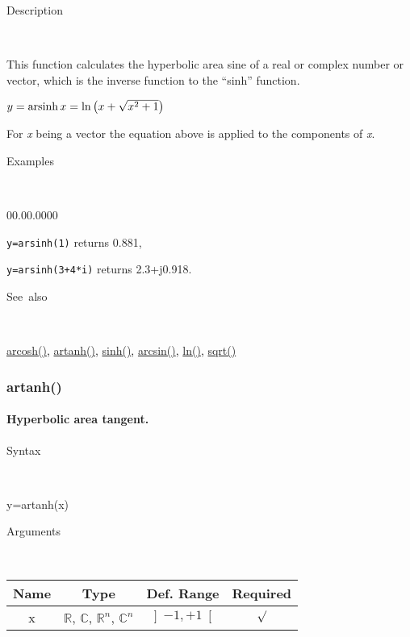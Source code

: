 \begin{description}
\item [Description]~
\end{description}
This function calculates the hyperbolic area sine of a real or complex
number or vector, which is the inverse function to the {}``sinh''
function.

\medskip{}
$y=\textrm{arsinh\,}x=\ln\left(x+\sqrt{x^{2}+1}\right)$ 
\medskip{}

\noindent For \textit{x} being a vector the equation above is applied
to the components of \textit{x}.

\begin{description}
\item [Examples]~
\end{description}
\begin{lyxlist}{00.00.0000}
\item [\texttt{y=arsinh(1)}]returns 0.881,
\item [\texttt{y=arsinh(3+4{*}i)}]returns 2.3+j0.918.
\end{lyxlist}
\begin{description}
\item [See~also]~
\end{description}
\textcolor{blue}{\hyperlink{arcosh}{arcosh()}}\textcolor{black}{,}
\textcolor{blue}{\hyperlink{artanh}{artanh()}}\textcolor{black}{,}
\textcolor{blue}{\hyperlink{sinh}{sinh()}}\textcolor{black}{,} \textcolor{blue}{\hyperlink{arcsin}{arcsin()}}\textcolor{black}{,}
\textcolor{blue}{\hyperlink{ln}{ln()}}\textcolor{black}{,} \textcolor{blue}{\hyperlink{sqrt}{sqrt()}}


\newpage
\subsubsection*{\hypertarget{artanh}{}{\Large artanh()}}


\paragraph{\label{par:Hyperbolic-area-tangent}Hyperbolic area tangent.}

\begin{description}
\item [Syntax]~
\end{description}
y=artanh(x)

\begin{description}
\item [Arguments]~
\end{description}
\begin{tabular}{|c|c|c|c|}
\hline 
Name&
Type&
Def. Range&
Required\tabularnewline
\hline
\hline 
x&
$\mathbb{R}$, $\mathbb{C}$, $\mathbb{R}^{n}$, $\mathbb{C}^{n}$&
$\left]-1,+1\right[$&
$\surd$\tabularnewline
\hline
\end{tabular}


